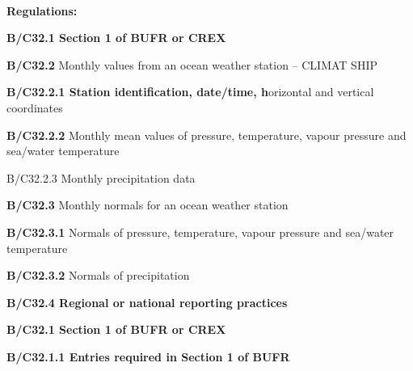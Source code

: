 \textbf{\\
Regulations:}

\textbf{B/C32.1 Section 1 of BUFR or CREX}

\textbf{B/C32.2} Monthly values from an ocean weather station -- CLIMAT SHIP

\textbf{B/C32.2.1 Station identification, date/time, h}orizontal and vertical coordinates

\textbf{B/C32.2.2} Monthly mean values of pressure, temperature, vapour pressure and sea/water temperature

B/C32.2.3 Monthly precipitation data

\textbf{B/C32.3} Monthly normals for an ocean weather station

\textbf{B/C32.3.1} Normals of pressure, temperature, vapour pressure and sea/water temperature

\textbf{B/C32.3.2} Normals of precipitation

\textbf{B/C32.4 Regional or national reporting practices}

\textbf{B/C32.1 Section 1 of BUFR or CREX}

\textbf{B/C32.1.1 Entries required in Section 1 of BUFR}

